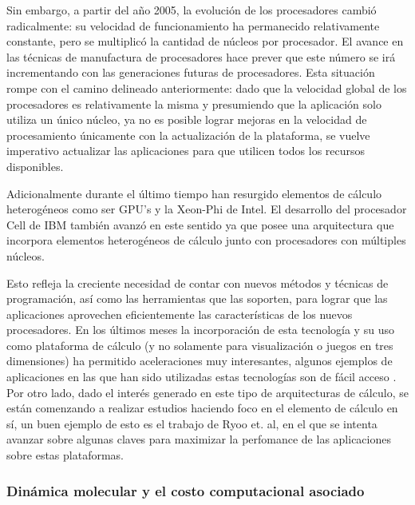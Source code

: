 \documentclass[a4paper,10pt]{article}
\begin{document}
Sin embargo, a partir del a\~no 2005, la evoluci\'on de los procesadores cambi\'o radicalmente: su velocidad de funcionamiento ha permanecido relativamente constante, pero se multiplic\'o la cantidad de n\'ucleos por procesador. 
El avance en las t\'ecnicas de manufactura de procesadores hace prever que este n\'umero se ir\'a incrementando con las generaciones futuras de procesadores.
Esta situaci\'on rompe con el camino delineado anteriormente: dado que la velocidad global de los procesadores es relativamente la misma y presumiendo que la aplicaci\'on solo utiliza un \'unico n\'ucleo, ya no es posible lograr mejoras en la velocidad de procesamiento \'unicamente con la actualizaci\'on de la plataforma, se vuelve imperativo actualizar las aplicaciones para que utilicen todos los recursos disponibles.

Adicionalmente durante el \'ultimo tiempo han resurgido elementos de c\'alculo heterog\'eneos como ser GPU's\cite{Nvidia-HPC,Stone2010} y la Xeon-Phi de Intel.
El desarrollo del procesador Cell de IBM \cite{Gschwind2006} tambi\'en avanz\'o en este sentido ya que posee una arquitectura que incorpora elementos heterog\'eneos de c\'alculo junto con procesadores con m\'ultiples n\'ucleos.

Esto refleja la creciente necesidad de contar con nuevos m\'etodos y t\'ecnicas de programaci\'on, as\'i como las herramientas que las soporten, para lograr que las aplicaciones aprovechen eficientemente las caracter\'isticas de los nuevos procesadores.
En los \'ultimos meses la incorporaci\'on de esta tecnolog\'ia y su uso como plataforma de c\'alculo (y no solamente para visualizaci\'on o juegos en tres dimensiones) ha permitido aceleraciones muy interesantes, algunos ejemplos de aplicaciones en las que han sido utilizadas estas tecnolog\'ias son de f\'acil acceso \cite{Galoppo2005,Rodrigues2008,Nitsche2014}.
Por otro lado, dado el inter\'es generado en este tipo de arquitecturas de c\'alculo, se est\'an comenzando a realizar estudios haciendo foco en el elemento de c\'alculo en s\'i, un buen ejemplo de esto es el trabajo de Ryoo et. al\cite{Ryoo2008}, en el que se intenta avanzar sobre algunas claves para maximizar la perfomance de las aplicaciones sobre estas plataformas.

\subsubsection*{Din\'amica molecular y el costo computacional asociado}
\end{document}
